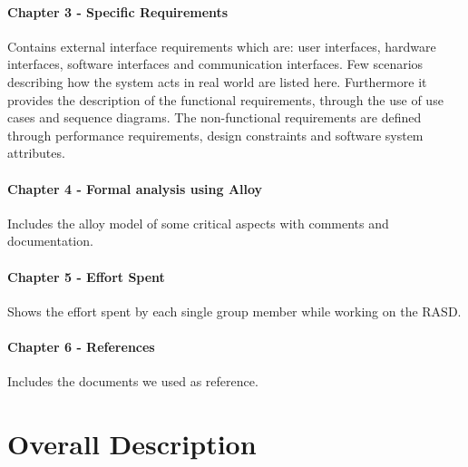 \documentclass{article}
\begin{document}
\paragraph{Chapter 3 - Specific Requirements}
Contains external interface requirements which are: user interfaces, hardware
interfaces, software interfaces and communication interfaces. Few scenarios
describing how the system acts in real world are listed here. Furthermore it
provides the description of the functional requirements, through the use of use
cases and sequence diagrams. The non-functional requirements are defined through
performance requirements, design constraints and software system attributes.
\paragraph{Chapter 4 - Formal analysis using Alloy}
Includes the alloy model of some critical aspects with comments and
documentation.
\paragraph{Chapter 5 - Effort Spent}
Shows the effort spent by each single group member while working on the RASD.
\paragraph{Chapter 6 - References}
Includes the documents we used as reference.

\newpage
\section{Overall Description}
\end{document}
